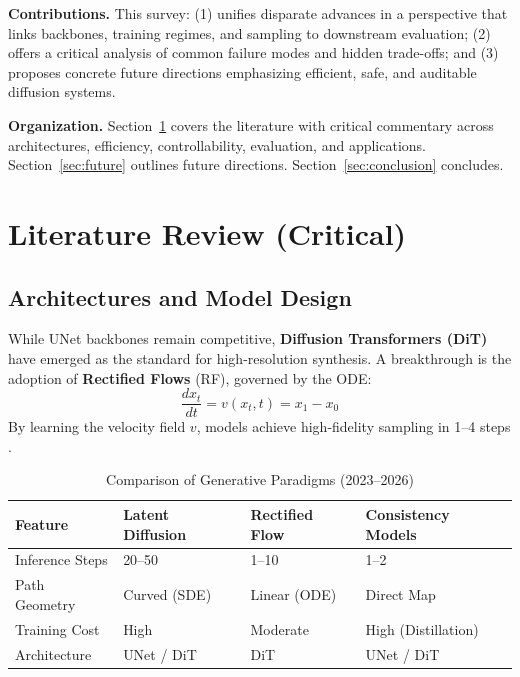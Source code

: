 \documentclass[conference]{IEEEtran}
\begin{document}
\textbf{Contributions.} This survey: (1) unifies disparate advances in a perspective that links backbones, training regimes, and sampling to downstream evaluation; (2) offers a critical analysis of common failure modes and hidden trade-offs; and (3) proposes concrete future directions emphasizing efficient, safe, and auditable diffusion systems. 

\textbf{Organization.} Section~\ref{sec:related} covers the literature with critical commentary across architectures, efficiency, controllability, evaluation, and applications. Section~\ref{sec:future} outlines future directions. Section~\ref{sec:conclusion} concludes.
\section{Literature Review (Critical)}\label{sec:related}

\subsection{Architectures and Model Design}
While UNet backbones remain competitive, \textbf{Diffusion Transformers (DiT)} have emerged as the standard for high-resolution synthesis. A breakthrough is the adoption of \textbf{Rectified Flows} (RF), governed by the ODE:
\begin{equation}
\frac{dx_t}{dt} = v(x_t, t) = x_1 - x_0
\end{equation}
By learning the velocity field $v$, models achieve high-fidelity sampling in 1--4 steps \cite{Lee2024RectifiedArxiv}.

\begin{table}[t]
\centering
\caption{Comparison of Generative Paradigms (2023--2026)}
\begin{tabular}{|l|l|l|l|}
\hline
\textbf{Feature} & \textbf{Latent Diffusion} & \textbf{Rectified Flow} & \textbf{Consistency Models} \\ \hline
Inference Steps & 20--50 & 1--10 & 1--2 \\ \hline
Path Geometry & Curved (SDE) & Linear (ODE) & Direct Map \\ \hline
Training Cost & High & Moderate & High (Distillation) \\ \hline
Architecture & UNet / DiT & DiT & UNet / DiT \\ \hline
\end{tabular}
\label{tab:comparison}
\end{table}
\end{document}
